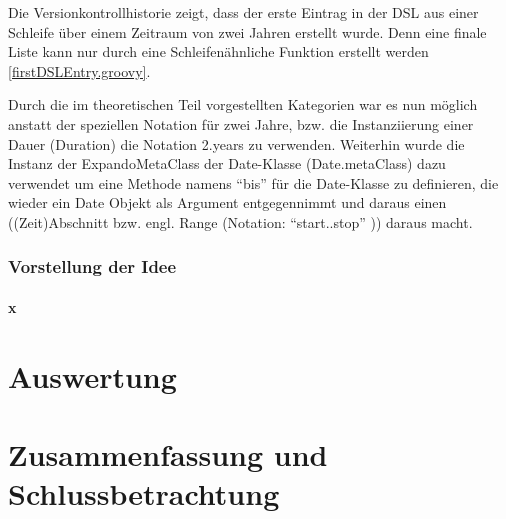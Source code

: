 \documentclass[11pt,english,ngerman, headsepline]{scrreprt}
\begin{document}


Die Versionkontrollhistorie zeigt, dass der erste Eintrag in der DSL aus einer
Schleife über einem Zeitraum von zwei Jahren erstellt wurde. Denn eine finale
Liste kann nur durch eine Schleifenähnliche Funktion erstellt werden
\ref{firstDSLEntry.groovy}.



Durch die im theoretischen Teil vorgestellten Kategorien war es nun möglich
anstatt der speziellen Notation für zwei Jahre, bzw. die Instanziierung einer
Dauer (Duration) die Notation 2.years zu verwenden. Weiterhin wurde die Instanz
der ExpandoMetaClass der Date-Klasse (Date.metaClass) dazu verwendet um eine
Methode namens ``bis'' für die Date-Klasse zu definieren, die wieder ein Date
Objekt als Argument entgegennimmt und daraus einen ((Zeit)Abschnitt bzw. engl.
Range (Notation: ``start..stop'' )) daraus macht.










\subsection{Vorstellung der Idee}

\subsubsection{x} 
\chapter{Auswertung}
 
\chapter{Zusammenfassung und Schlussbetrachtung}
\end{document}
